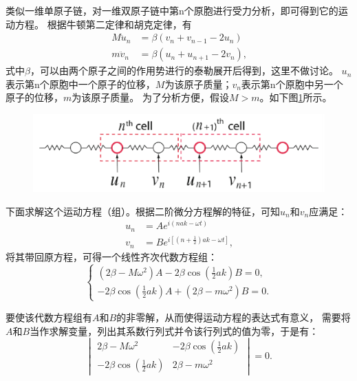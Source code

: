 \documentclass[declarePage]{ecnuthesis}
\begin{document}
类似一维单原子链，对一维双原子链中第n个原胞进行受力分析，即可得到它的运动方程。%
根据牛顿第二定律和胡克定律，有
\begin{align}
    M \ddot{u}_n &= \beta (v_n + v_{n-1} - 2u_n)\\
    m \ddot{v}_n &= \beta (u_n + u_{n+1} - 2v_n) \text{,}
\end{align}
式中$\beta$，可以由两个原子之间的作用势进行的泰勒展开后得到，这里不做讨论。%
$u_n$表示第n个原胞中一个原子的位移，$M$为该原子质量；$v_n$表示第n个原胞中另一个原子的位移，$m$为该原子质量。%
为了分析方便，假设$M>m$。如下图\ref{1DDCEOF}所示。
\begin{figure}[htb]
    \centering
    \includegraphics[width=.7\textwidth]{1DDCEOF.png}
    \label{1DDCEOF}
\end{figure}

下面求解这个运动方程（组）。根据二阶微分方程解的特征，可知$u_n$和$v_n$应满足：
\begin{align}
    u_n &= A e^{i(nak - \omega t)}\\
    v_n &= B e^{i[(n + \frac{1}{2}) ak - \omega t]} \text{,} \label{1DDCEOM}
\end{align}
将其带回原方程，可得一个线性齐次代数方程组：
\begin{equation}
    \begin{cases}
        (2 \beta - M \omega ^2)A-2 \beta \cos (\frac{1}{2}ak)B = 0 \text{,}\\
        -2\beta\cos (\frac{1}{2}ak)A + (2\beta - m \omega ^2)B = 0 \text{.}
    \end{cases}
\end{equation}

要使该代数方程组有$A$和$B$的非零解，从而使得运动方程的表达式有意义，%
需要将$A$和$B$当作求解变量，列出其系数行列式并令该行列式的值为零，于是有：
\begin{equation}
    \begin{vmatrix}
        2 \beta - M \omega ^2 & -2 \beta \cos (\frac{1}{2}ak)\\
        -2\beta\cos (\frac{1}{2}ak) & 2\beta - m \omega ^2
    \end{vmatrix}
    =0 \text{.}
\end{equation}
\end{document}
